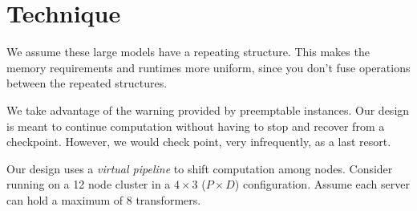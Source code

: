 \section{Technique}
\label{sec:technique}

We assume these large models have a repeating structure.
This makes the memory requirements and runtimes more uniform, since you don't
fuse operations between the repeated structures.

We take advantage of the warning provided by preemptable instances.
Our design is meant to continue computation without having to stop and recover
from a checkpoint.
However, we would check point, very infrequently, as a last resort.

Our design uses a \textit{virtual pipeline} to shift computation among nodes.
Consider running on a 12 node cluster in a $4 \times 3$ ($P \times D$)
configuration.
Assume each server can hold a maximum of 8 transformers.
